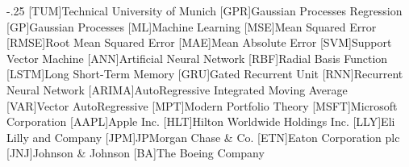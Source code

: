 \documentclass[headsepline,footsepline,footinclude=false,oneside,fontsize=11pt,paper=a4,listof=totoc,bibliography=totoc]{scrbook} %
\begin{document}


\frontmatter{}





\tableofcontents{}

\mainmatter{}










\appendix{}


\begin{acronym}
	\itemsep-.25\baselineskip
	[TUM]{Technical University of Munich}
	[GPR]{Gaussian Processes Regression}
	[GP]{Gaussian Processes}
	[ML]{Machine Learning}
	[MSE]{Mean Squared Error}
	[RMSE]{Root Mean Squared Error}
	[MAE]{Mean Absolute Error}
	[SVM]{Support Vector Machine}
	[ANN]{Artificial Neural Network}
	[RBF]{Radial Basis Function}
	[LSTM]{Long Short-Term Memory}
	[GRU]{Gated Recurrent Unit}
	[RNN]{Recurrent Neural Network}
	[ARIMA]{AutoRegressive Integrated Moving Average}
	[VAR]{Vector AutoRegressive}
	[MPT]{Modern Portfolio Theory}
	[MSFT]{Microsoft Corporation}
	[AAPL]{Apple Inc.}
	[HLT]{Hilton Worldwide Holdings Inc.}
	[LLY]{Eli Lilly and Company}
	[JPM]{JPMorgan Chase \& Co.}
	[ETN]{Eaton Corporation plc}
	[JNJ]{Johnson \& Johnson}
	[BA]{The Boeing Company}
\end{acronym}


\listoffigures{}
\listoftables{}
\printbibliography{}
\end{document}
